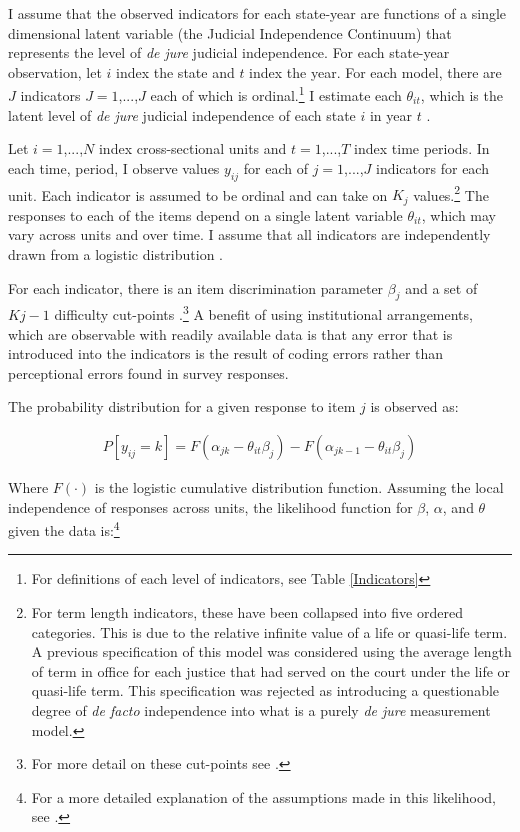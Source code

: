 \documentclass[12pt]{article}
\begin{document}
I assume that the observed indicators for each state-year are functions of a single dimensional latent variable (the Judicial Independence Continuum) that represents the level of \textit{de jure} judicial independence.  For each state-year observation, let $i$ index the state and $t$ index the year.  For each model, there are $J$ indicators $J=1$,...,$J$ each of which is ordinal.\footnote{For definitions of each level of indicators, see Table \ref{Indicators}} I estimate each $\theta_{it}$, which is the latent level of \textit{de jure} judicial independence of each state $i$ in year $t$ \citep[7]{Schnakenberg2014}.

Let $i=1$,...,$N$ index cross-sectional units and $t=1$,...,$T$ index time periods.  In each time, period, I observe values $y_{ij}$ for each of $j=1$,...,$J$ indicators for each unit.  Each indicator is assumed to be ordinal and can take on $K_j$ values.\footnote{For term length indicators, these have been collapsed into five ordered categories.  This is due to the relative infinite value of a life or quasi-life term.  A previous specification of this model was considered using the average length of term in office for each justice that had served on the court under the life or quasi-life term.  This specification was rejected as introducing a questionable degree of \textit{de facto} independence into what is a purely \textit{de jure} measurement model.}  The responses to each of the items depend on a single latent variable $\theta_{it}$, which may vary across units and over time. I assume that all indicators are independently drawn from a logistic distribution \citep[7]{Schnakenberg2014}. 

For each indicator, there is an item discrimination parameter $\beta_j$ and a set of $Kj-1$ difficulty cut-points \citep[7]{Schnakenberg2014}.\footnote{For more detail on these cut-points see \citet{Treier2008,Schnakenberg2014}.}  A benefit of using institutional arrangements, which are observable with readily available data is that any error that is introduced into the indicators is the result of coding errors rather than perceptional errors found in survey responses.  

The probability distribution for a given response to item $j$ is observed as:

\begin{align}
P[y_{ij}=k]=F(\alpha_{jk}-\theta_{it}\beta_j)-F(\alpha_{jk-1}-\theta_{it}\beta_j)
\end{align} 

Where $F(\cdot)$ is the logistic cumulative distribution function.  Assuming the local independence of responses across units, the likelihood function for $\beta$, $\alpha$, and $\theta$ given the data is:\footnote{For a more detailed explanation of the assumptions made in this likelihood, see \citet[8]{Schnakenberg2014}.}
\end{document}
